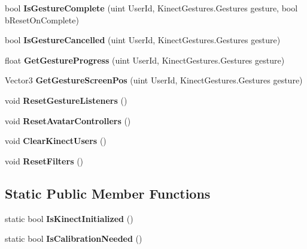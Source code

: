 \begin{DoxyCompactItemize}
bool {\bfseries Is\+Gesture\+Complete} (uint User\+Id, Kinect\+Gestures.\+Gestures gesture, bool b\+Reset\+On\+Complete)
\item 
\mbox{\label{class_kinect_manager_a6642ea6b0a23a7a0f41f24f4e8462c6e}} 
bool {\bfseries Is\+Gesture\+Cancelled} (uint User\+Id, Kinect\+Gestures.\+Gestures gesture)
\item 
\mbox{\label{class_kinect_manager_af436804eb157c64939d7c6c2e702692e}} 
float {\bfseries Get\+Gesture\+Progress} (uint User\+Id, Kinect\+Gestures.\+Gestures gesture)
\item 
\mbox{\label{class_kinect_manager_ae49078d0c021ce0b32ec9184473d6d1c}} 
Vector3 {\bfseries Get\+Gesture\+Screen\+Pos} (uint User\+Id, Kinect\+Gestures.\+Gestures gesture)
\item 
\mbox{\label{class_kinect_manager_a953a21442c027afb9e90e2050d51a3a5}} 
void {\bfseries Reset\+Gesture\+Listeners} ()
\item 
\mbox{\label{class_kinect_manager_aea21a184826f2f9246c3454c42ca8977}} 
void {\bfseries Reset\+Avatar\+Controllers} ()
\item 
\mbox{\label{class_kinect_manager_a67fb0d4dcae391f1001946e824a6da03}} 
void {\bfseries Clear\+Kinect\+Users} ()
\item 
\mbox{\label{class_kinect_manager_a8fbf332b12f038ddfdaf57ea901814eb}} 
void {\bfseries Reset\+Filters} ()
\end{DoxyCompactItemize}
\subsection*{Static Public Member Functions}
\begin{DoxyCompactItemize}
\item 
\mbox{\label{class_kinect_manager_a8ae249cd0d129fbb074a0adea775c17b}} 
static bool {\bfseries Is\+Kinect\+Initialized} ()
\item 
\mbox{\label{class_kinect_manager_ad2199069d8de4de2310bd3c5099c3aca}} 
static bool {\bfseries Is\+Calibration\+Needed} ()
\end{DoxyCompactItemize}
